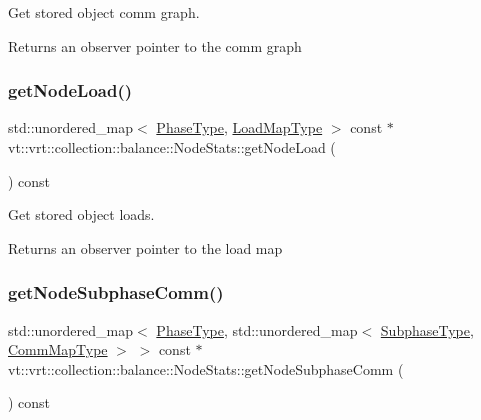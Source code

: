 Get stored object comm graph. 

\begin{DoxyReturn}{Returns}
an observer pointer to the comm graph 
\end{DoxyReturn}
\mbox{\label{structvt_1_1vrt_1_1collection_1_1balance_1_1_node_stats_a5b34d26f9e10f7ff3ceb92b95f0ed2f6}} 
\subsubsection{\texorpdfstring{get\+Node\+Load()}{getNodeLoad()}}
{\footnotesize\ttfamily std\+::unordered\+\_\+map$<$ \hyperlink{namespacevt_a46ce6733d5cdbd735d561b7b4029f6d7}{Phase\+Type}, \hyperlink{namespacevt_1_1vrt_1_1collection_1_1balance_a5339303db2e1ce964d783a53fd74e6b1}{Load\+Map\+Type} $>$ const  $\ast$ vt\+::vrt\+::collection\+::balance\+::\+Node\+Stats\+::get\+Node\+Load (\begin{DoxyParamCaption}{ }\end{DoxyParamCaption}) const}



Get stored object loads. 

\begin{DoxyReturn}{Returns}
an observer pointer to the load map 
\end{DoxyReturn}
\mbox{\label{structvt_1_1vrt_1_1collection_1_1balance_1_1_node_stats_ae44b616cad5c50a36faeb2cc78457a52}} 
\subsubsection{\texorpdfstring{get\+Node\+Subphase\+Comm()}{getNodeSubphaseComm()}}
{\footnotesize\ttfamily std\+::unordered\+\_\+map$<$ \hyperlink{namespacevt_a46ce6733d5cdbd735d561b7b4029f6d7}{Phase\+Type}, std\+::unordered\+\_\+map$<$ \hyperlink{namespacevt_ae78cbfdf1e57470e33eedb074f2beeba}{Subphase\+Type}, \hyperlink{namespacevt_1_1vrt_1_1collection_1_1balance_a01ee1fb0ae2da1d2ab7fdca3be9ae351}{Comm\+Map\+Type} $>$ $>$ const  $\ast$ vt\+::vrt\+::collection\+::balance\+::\+Node\+Stats\+::get\+Node\+Subphase\+Comm (\begin{DoxyParamCaption}{ }\end{DoxyParamCaption}) const}



